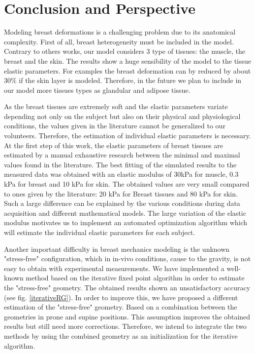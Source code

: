 \section{Conclusion and Perspective}
Modeling breast deformations is a challenging problem due to its anatomical complexity. First of all, breast heterogeneity must be included in the model. Contrary to others works, our model considers 3 type of tissues: the muscle, the breast and the skin. The results show a huge sensibility of the model to the tissue elastic parameters. For examples the breast deformation can by reduced by about $30\%$ if the skin layer is modeled. Therefore, in the future we plan to include in our model more tissues types as glandular and adipose tissue.

 As the breast tissues are extremely soft and the elastic parameters variate depending not only on the subject but also on their physical and physiological conditions, the values given in the literature cannot be generalized to our volunteers. Therefore, the estimation of individual elastic parameters is necessary. At the first step of this work, the elastic parameters of breast tissues are estimated by a manual exhaustive research between the minimal and maximal values found in the literature. The best fitting of the simulated results to the measured data was obtained with an elastic modulus of 30kPa for muscle, 0.3 kPa for breast and 10 kPa for skin. The obtained values are very small compared to ones given by the literature: 20 kPa for Breast tissues and 80 kPa for skin. Such a large difference can be explained by the various conditions during data acquisition and different mathematical models. The large variation of the elastic modulus motivates us to implement an automated optimization algorithm which will estimate the individual elastic parameters for each subject.      
 
Another important difficulty in breast mechanics modeling is the unknown "stress-free" configuration, which in in-vivo conditions, cause to the gravity, is not easy to obtain with experimental measurements. We have implemented a well-known method based on the iterative fixed point algorithm in order to estimate the "stress-free" geometry. The obtained results shown an unsatisfactory accuracy (see fig. \ref{iterativeRG}). In order to improve this, we have proposed a different estimation of the "stress-free" geometry. Based on a combination between the geometries in prone and supine positions. This assumption improves the obtained results but still need more corrections. Therefore, we intend to integrate the two methods by using the combined geometry as an initialization for the iterative algorithm.  


